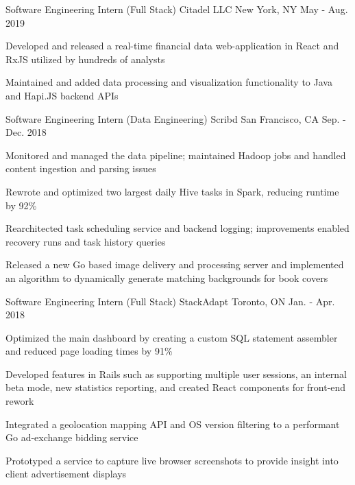 
\begin{cventries}
  \cventry
    {Software Engineering Intern (Full Stack)} %
    {Citadel LLC} %
    {New York, NY} %
    {May - Aug. 2019} %
    {
      \begin{cvitems} %
        \item {Developed and released a real-time financial data web-application in React and RxJS utilized by hundreds of analysts}
        \item {Maintained and added data processing and visualization functionality to Java and Hapi.JS backend APIs}
      \end{cvitems}
    }

  \cventry
    {Software Engineering Intern (Data Engineering)} %
    {Scribd} %
    {San Francisco, CA} %
    {Sep. - Dec. 2018} %
    {
      \begin{cvitems} %
        \item {Monitored and managed the data pipeline; maintained Hadoop jobs and handled content ingestion and parsing issues}
        \item {Rewrote and optimized two largest daily Hive tasks in Spark, reducing runtime by 92\%}
        \item {Rearchitected task scheduling service and backend logging; improvements enabled recovery runs and task history queries}
        \item {Released a new Go based image delivery and processing server and implemented an algorithm to dynamically generate matching backgrounds for book covers}
      \end{cvitems}
    }

  \cventry
    {Software Engineering Intern (Full Stack)} %
    {StackAdapt} %
    {Toronto, ON} %
    {Jan. - Apr. 2018} %
    {
      \begin{cvitems} %
        \item {Optimized the main dashboard by creating a custom SQL statement assembler and reduced page loading times by 91\%}
        \item {Developed features in Rails such as supporting multiple user sessions, an internal beta mode, new statistics reporting, and created React components for front-end rework}
        \item {Integrated a geolocation mapping API and OS version filtering to a performant Go ad-exchange bidding service}
        \item {Prototyped a service to capture live browser screenshots to provide insight into client advertisement displays}
      \end{cvitems}
    }


\end{cventries}
